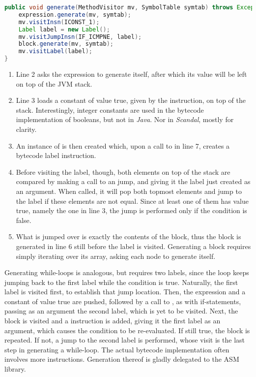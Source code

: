 \pagebreak

\begin{lstlisting}[language=Java,caption={Generating If-Statements.},label={alg:if}]
public void generate(MethodVisitor mv, SymbolTable symtab) throws Exception {
	expression.generate(mv, symtab);
	mv.visitInsn(ICONST_1);
	Label label = new Label();
	mv.visitJumpInsn(IF_ICMPNE, label);
	block.generate(mv, symtab);
	mv.visitLabel(label);
}
\end{lstlisting}

\begin{enumerate}
	\addtocounter{enumi}{1}
	\item Line 2 asks the expression to generate itself, after which its value will be left on top of the JVM stack.
	\item Line 3 loads a constant of value true, given by the  instruction, on top of the stack. Interestingly, integer constants are used in the bytecode implementation of booleans, but not in \emph{Java}. Nor in \emph{Scandal}, mostly for clarity.
	\item An instance of  is then created which, upon a call to  in line 7, creates a bytecode label instruction.
	\item Before visiting the label, though, both elements on top of the stack are compared by making a call to an  jump, and giving it the label just created as an argument. When called, it will pop both topmost elements and jump to the label if these elements are not equal. Since at least one of them has value true, namely the one in line 3, the jump is performed only if the condition is false.
	\item What is jumped over is exactly the contents of the block, thus the block is generated in line 6 still before the label is visited. Generating a block requires simply iterating over its  array, asking each node to generate itself.
\end{enumerate}

Generating while-loops is analogous, but requires two labels, since the loop keeps jumping back to the first label while the condition is true. Naturally, the first label is visited first, to establish that jump location. Then, the expression and a constant of value true are pushed, followed by a call to , as with if-statements, passing as an argument the second label, which is yet to be visited. Next, the block is visited and a  instruction is added, giving it the first label as an argument, which causes the condition to be re-evaluated. If still true, the block is repeated. If not, a jump to the second label is performed, whose visit is the last step in generating a while-loop. The actual bytecode implementation often involves more instructions. Generation thereof is gladly delegated to the ASM library.

